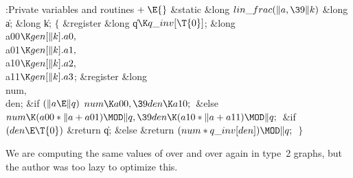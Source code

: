 \Y\B\4:Private variables and routines\X${}\mathrel+\E{}$\6
\1\1\&{static} \&{long} ${}\\{lin\_frac}(\|a,\39\|k){}$\6
\&{long} \|a;\6
\&{long} \|k;\2\2\6
${}\{{}$\5
\1\&{register} \&{long} \|q${}\K\\{q\_inv}[\T{0}]{}$;\6
\&{long} \\{a00}${}\K\\{gen}[\|k].\\{a0},{}$ \\{a01}${}\K\\{gen}[\|k].%
\\{a1},{}$ \\{a10}${}\K\\{gen}[\|k].\\{a2},{}$ \\{a11}${}\K\\{gen}[\|k].%
\\{a3}{}$;\6
\&{register} \&{long} \\{num}${},{}$ \\{den};\7
\&{if} ${}(\|a\E\|q){}$\1\5
${}\\{num}\K\\{a00},\39\\{den}\K\\{a10};{}$\2\6
\&{else}\1\5
${}\\{num}\K(\\{a00}*\|a+\\{a01})\MOD\|q,\39\\{den}\K(\\{a10}*\|a+\\{a11})\MOD%
\|q;{}$\2\6
\&{if} ${}(\\{den}\E\T{0}){}$\1\5
\&{return} \|q;\2\6
\&{else}\1\5
\&{return} ${}(\\{num}*\\{q\_inv}[\\{den}])\MOD\|q;{}$\2\6
\4${}\}{}$\2\par
\fi

We are computing the same values of  over and over
again in type~2
graphs, but the author was too lazy to optimize this.

